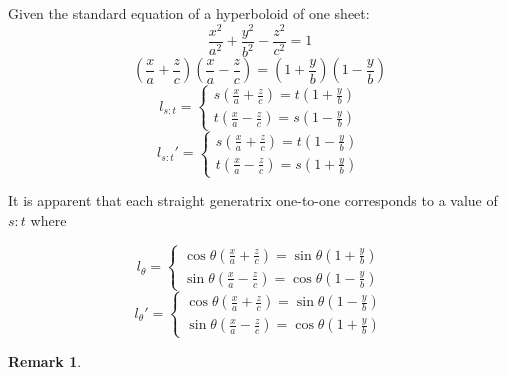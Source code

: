 \documentclass[onecolumn]{ctexart}
\newtheorem{remark}{Remark}
\begin{document}
Given the standard equation of a hyperboloid of one sheet:
\begin{equation}
  \frac{x^2}{a^2} + \frac{y^2}{b^2} - \frac{z^2}{c^2} = 1
\end{equation}
\[
  (\frac{x}{a} + \frac{z}{c})(\frac{x}{a} - \frac{z}{c}) = (1 + \frac{y}{b})(1 - \frac{y}{b})
\]
\begin{equation}
  l_{s:t} =
  \begin{cases}
    s(\frac{x}{a} + \frac{z}{c}) = t(1 + \frac{y}{b}) \\
    t(\frac{x}{a} - \frac{z}{c}) = s(1 - \frac{y}{b})
  \end{cases}
\end{equation}
\begin{equation}
  l_{s:t}' =
  \begin{cases}
    s(\frac{x}{a} + \frac{z}{c}) = t(1 - \frac{y}{b}) \\
    t(\frac{x}{a} - \frac{z}{c}) = s(1 + \frac{y}{b})
  \end{cases}
\end{equation}

It is apparent that each straight generatrix one-to-one corresponds to a value of $s:t$ where

\begin{equation}
  l_{\theta} =
  \begin{cases}
    \cos\theta(\frac{x}{a} + \frac{z}{c}) = \sin\theta(1 + \frac{y}{b}) \\
    \sin\theta(\frac{x}{a} - \frac{z}{c}) = \cos\theta(1 - \frac{y}{b})
  \end{cases}
\end{equation}
\begin{equation}
  l_{\theta}' =
  \begin{cases}
    \cos\theta(\frac{x}{a} + \frac{z}{c}) = \sin\theta(1 - \frac{y}{b}) \\
    \sin\theta(\frac{x}{a} - \frac{z}{c}) = \cos\theta(1 + \frac{y}{b})
  \end{cases}
\end{equation}

\begin{remark}
  
\end{remark}
\end{document}
